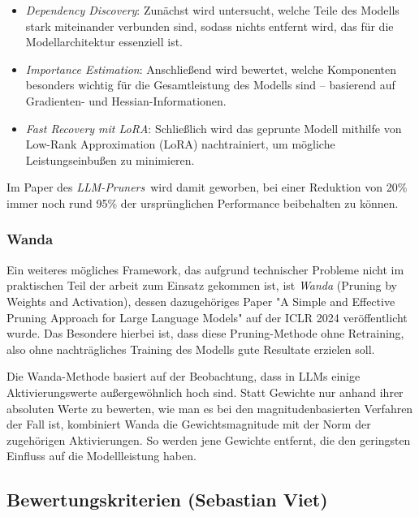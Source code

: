 \begin{itemize}
	\item \emph{Dependency Discovery}: Zunächst wird untersucht, welche Teile
	      des Modells stark miteinander verbunden sind, sodass nichts entfernt
	      wird, das für die Modellarchitektur essenziell ist.

	\item \emph{Importance Estimation}: Anschließend wird bewertet, welche
	      Komponenten besonders wichtig für die Gesamtleistung des Modells sind –
	      basierend auf Gradienten- und Hessian-Informationen.

	\item \emph{Fast Recovery mit LoRA}: Schließlich wird das geprunte Modell
	      mithilfe von Low-Rank Approximation (LoRA) nachtrainiert, um mögliche
	      Leistungseinbußen zu minimieren.
\end{itemize}

Im Paper des \emph{LLM-Pruners} wird damit geworben, bei einer Reduktion von
20\% immer noch rund 95\% der ursprünglichen Performance beibehalten zu können.

\subsubsection{Wanda}

Ein weiteres mögliches Framework, das aufgrund technischer Probleme nicht im
praktischen Teil der arbeit zum Einsatz gekommen ist, ist \emph{Wanda} (Pruning
by Weights and Activation), dessen dazugehöriges Paper "A Simple and Effective
Pruning Approach for Large Language Models" auf der ICLR 2024 veröffentlicht
wurde. Das Besondere hierbei ist, dass diese Pruning-Methode ohne Retraining,
also ohne nachträgliches Training des Modells gute Resultate erzielen
soll.\autocite[Vgl.][]{wanda}

Die Wanda-Methode basiert auf der Beobachtung, dass in LLMs einige
Aktivierungswerte außergewöhnlich hoch sind. Statt Gewichte nur anhand ihrer
absoluten Werte zu bewerten, wie man es bei den magnitudenbasierten Verfahren
der Fall ist, kombiniert Wanda die Gewichtsmagnitude mit der Norm der
zugehörigen Aktivierungen. So werden jene Gewichte entfernt, die den geringsten
Einfluss auf die Modellleistung haben.

\subsection{Bewertungskriterien (Sebastian Viet)}

